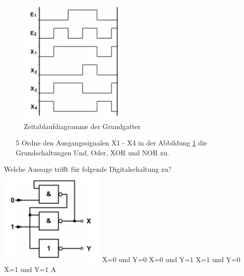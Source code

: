 \begin{figure}[H]
	\centering
	\includegraphics[scale=0.8]{Digitaltechnik/Bilder/TC707.png}
	\caption{Zeitablaufdiagramme der Grundgatter}
	\label{Grundgatter}
	\end{figure}



\begin{enumerate}
		\item[5] Ordne den Ausgangssignalen X1 - X4 in der Abbildung \ref{Grundgatter} die Grundschaltungen Und, Oder, XOR und NOR zu.\\ 
	\end{enumerate}


{Welche Aussage trifft für folgende Digitalschaltung zu?\\ \includegraphics[scale=0.65]{Digitaltechnik/Bilder/TC704.png}}%
{X=0 und Y=0}%
{X=0 und Y=1}%
{X=1 und Y=0}%
{X=1 und Y=1}%
{A}%